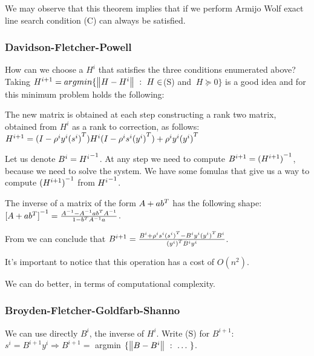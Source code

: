 \documentclass[computationalMathematics.tex]{subfiles}
\begin{document}
\begin{obs}
  We may observe that this theorem implies that if we perform Armijo Wolf exact line search condition (C) can always be satisfied.
\end{obs}

\subsubsection{Davidson-Fletcher-Powell}
How can we choose a $H^i$ that satisfies the three conditions enumerated above? Taking $H^{i+1} =argmin \{\left\lVert H - H^i\right\rVert~:~H \in$(S) and $ ~ H \succeq 0\}$ is a good idea and for this minimum problem holds the following:

\begin{theorem}
  The new matrix is obtained at each step constructing a rank two matrix, obtained from $H^i$ as a rank to correction, as follows:
  $H^{i+1} = (I - \rho^i y^i {(s^i)}^{T}) H^i(I - \rho^i s^i {(y^i)}^{T}) + \rho^i y^i {(y^i)}^{T}$
\end{theorem}

Let us denote $B^i = {H^i}^{-1}$.
At any step we need to compute $B^{i+1} = {(H^{i+1})}^{-1}$, because we need to solve the system. We have some fomulas that give us a way to compute ${(H^{i+1})}^{-1}$ from ${H^i}^{-1}$.

\begin{theorem}\label{theo:16novsmw}
  The inverse of a matrix of the form $A + a {b}^{T}$ has the following shape:
  ${[A + a {b}^{T}]}^{-1} = \frac{{A}^{-1} - {A}^{-1} a {b}^{T} {A}^{-1}}{1 - {b}^{T} {A}^{-1} a}$.
\end{theorem}

\begin{obs}
  From  we can conclude that $B^{i+1} = \frac{B^i + \rho^i s^i {(s^i)}^{T} - B^i y^i {(y^i)}^{T}B^i}{{(y^i)}^{T} B^i y^i}$.
\end{obs}
It's important to notice that this operation has a cost of $O(n^2)$.

We can do better, in terms of computational complexity.

\subsubsection{Broyden-Fletcher-Goldfarb-Shanno}

We can use directly $B^i$, the inverse of $H^i$.
Write (S) for $B^{i+1}$: $s^i = B^{i+1} y^i \Longrightarrow B^{i+1} =$ argmin $\{\left\lVert B - B^i\right\rVert~:~\ldots~ \}$.
\end{document}
